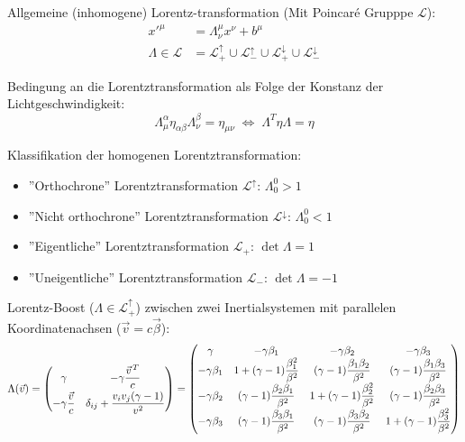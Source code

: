 			\noindent
			Allgemeine (inhomogene) Lorentz-transformation (Mit Poincaré Grupppe $\mathcal{L}$):
			\begin{equation}
				\begin{aligned}
					x'^\mu &= \Lambda^\mu_{\nu} x^\nu + b^\mu \\
					\Lambda \in \mathcal{L} &= \mathcal{L}^\uparrow_+ \cup \mathcal{L}^\uparrow_- \cup \mathcal{L}^\downarrow_+ \cup \mathcal{L}^\downarrow_-
				\end{aligned}
			\end{equation}

			\noindent
			Bedingung an die Lorentztransformation als Folge der Konstanz der Lichtgeschwindigkeit:
			\begin{equation}
				\Lambda^{\alpha}_{\mu} \eta_{\alpha\beta} \Lambda^{\beta}_{\nu} = \eta_{\mu\nu}
				 \;\Leftrightarrow\; \Lambda^T \eta \Lambda = \eta
			\end{equation}

			\noindent
			Klassifikation der homogenen Lorentztransformation:
			\begin{itemize}
				\item ''Orthochrone'' Lorentztransformation $\mathcal{L}^\uparrow$: $\Lambda^0_0 > 1$
				\item ''Nicht orthochrone'' Lorentztransformation $\mathcal{L}^\downarrow$: $\Lambda^0_0 < 1$
				\item ''Eigentliche'' Lorentztransformation $\mathcal{L}_+$: $\det\Lambda = 1$
				\item ''Uneigentliche'' Lorentztransformation $\mathcal{L}_-$: $\det\Lambda = -1$
			\end{itemize}

			\noindent
			Lorentz-Boost ($\Lambda\in\mathcal{L}^\uparrow_+$) zwischen zwei Inertialsystemen mit parallelen Koordinatenachsen ($\vec{v}=c\vec{\beta}$):
			\begin{equation}
				\Lambda(\vec{v}) = \left( \begin{matrix}
					\gamma & -\gamma\dfrac{\pvec{v}^T}{c} \\[6pt]
					-\gamma\dfrac{\vec{v}}{c} & \delta_{ij}+\dfrac{v_i v_j(\gamma-1)}{v^2}
					\end{matrix} \right)
					=
					\left(\begin{matrix}
						\gamma & -\gamma \beta_1 & -\gamma \beta_2 & -\gamma \beta_3 \\
						-\gamma \beta_1 & 1+(\gamma -1){\dfrac {\beta_1^{2}}{\beta^{2}}} & (\gamma -1){\dfrac {\beta_1 \beta_2}{\beta^{2}}}&(\gamma -1){\dfrac {\beta_1\beta_3}{\beta^{2}}} \\
						-\gamma \beta_2 & (\gamma -1){\dfrac {\beta_2\beta_1}{\beta^{2}}} & 1+(\gamma -1){\dfrac {\beta_2^{2}}{\beta^{2}}}&(\gamma -1){\dfrac {\beta_2 \beta_3}{\beta^{2}}} \\
						-\gamma \beta_3 &(\gamma -1){\dfrac {\beta_3\beta_1}{\beta^{2}}}&(\gamma -1){\dfrac {\beta_3\beta_2}{\beta^{2}}}&1+(\gamma -1){\dfrac {\beta_3^{2}}{\beta^{2}}}
					\end{matrix}\right)
			\end{equation}

